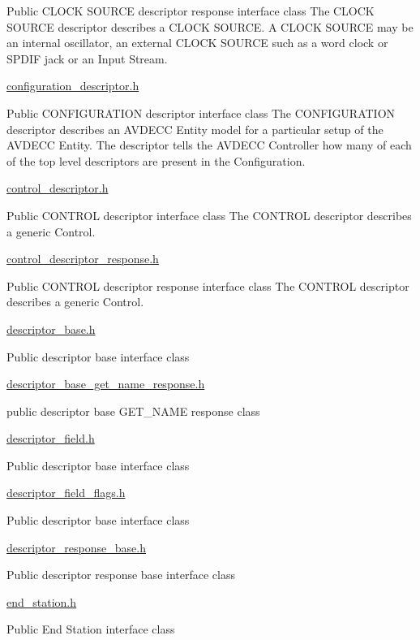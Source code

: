 Public C\+L\+O\+CK S\+O\+U\+R\+CE descriptor response interface class The C\+L\+O\+CK S\+O\+U\+R\+CE descriptor describes a C\+L\+O\+CK S\+O\+U\+R\+CE. A C\+L\+O\+CK S\+O\+U\+R\+CE may be an internal oscillator, an external C\+L\+O\+CK S\+O\+U\+R\+CE such as a word clock or S\+P\+D\+IF jack or an Input Stream.

\hyperlink{configuration__descriptor_8h}{configuration\+\_\+descriptor.\+h}

Public C\+O\+N\+F\+I\+G\+U\+R\+A\+T\+I\+ON descriptor interface class The C\+O\+N\+F\+I\+G\+U\+R\+A\+T\+I\+ON descriptor describes an A\+V\+D\+E\+CC Entity model for a particular setup of the A\+V\+D\+E\+CC Entity. The descriptor tells the A\+V\+D\+E\+CC Controller how many of each of the top level descriptors are present in the Configuration.

\hyperlink{control__descriptor_8h}{control\+\_\+descriptor.\+h}

Public C\+O\+N\+T\+R\+OL descriptor interface class The C\+O\+N\+T\+R\+OL descriptor describes a generic Control.

\hyperlink{control__descriptor__response_8h}{control\+\_\+descriptor\+\_\+response.\+h}

Public C\+O\+N\+T\+R\+OL descriptor response interface class The C\+O\+N\+T\+R\+OL descriptor describes a generic Control.

\hyperlink{descriptor__base_8h}{descriptor\+\_\+base.\+h}

Public descriptor base interface class

\hyperlink{descriptor__base__get__name__response_8h}{descriptor\+\_\+base\+\_\+get\+\_\+name\+\_\+response.\+h}

public descriptor base G\+E\+T\+\_\+\+N\+A\+ME response class

\hyperlink{descriptor__field_8h}{descriptor\+\_\+field.\+h}

Public descriptor base interface class

\hyperlink{descriptor__field__flags_8h}{descriptor\+\_\+field\+\_\+flags.\+h}

Public descriptor base interface class

\hyperlink{descriptor__response__base_8h}{descriptor\+\_\+response\+\_\+base.\+h}

Public descriptor response base interface class

\hyperlink{end__station_8h}{end\+\_\+station.\+h}

Public End Station interface class


